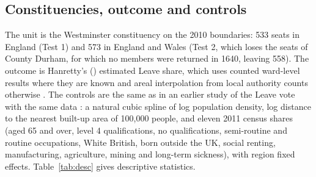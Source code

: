 \documentclass[11pt,a4paper]{article}
\begin{document}
\subsection{Constituencies, outcome and controls}
The unit is the Westminster constituency on the 2010 boundaries: 533 seats in England (Test 1) and 573 in England and Wales (Test 2, which loses the seats of County Durham, for which no members were returned in 1640, leaving 558). The outcome is Hanretty's (\citeyear{hanretty2017}) estimated Leave share, which uses counted ward-level results where they are known and areal interpolation from local authority counts otherwise \citep{parlitools}. The controls are the same as in an earlier study of the Leave vote with the same data \citep{hotham2026bl}: a natural cubic spline of log population density, log distance to the nearest built-up area of 100,000 people, and eleven 2011 census shares (aged 65 and over, level 4 qualifications, no qualifications, semi-routine and routine occupations, White British, born outside the UK, social renting, manufacturing, agriculture, mining and long-term sickness), with region fixed effects. Table~\ref{tab:desc} gives descriptive statistics.
\end{document}
